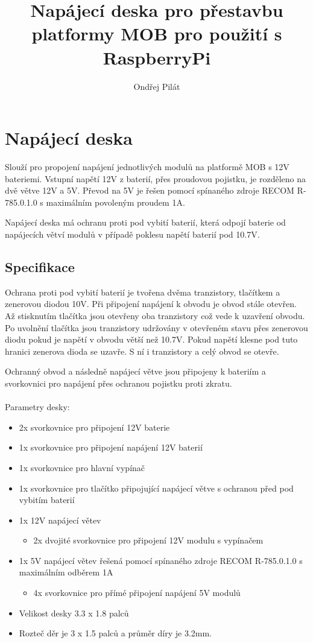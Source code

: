 \documentclass[a4paper,11pt]{article}
\author{Ondřej Pilát}
\title{Napájecí deska pro přestavbu platformy MOB pro použití s RaspberryPi}
\begin{document}
\maketitle
\newpage
\tableofcontents
\newpage
\section{Napájecí deska}
Slouží pro propojení napájení jednotlivých modulů na platformě MOB s 12V bateriemi. Vstupní napětí 12V z baterií, přes proudovou pojistku, je rozděleno na dvě větve 12V a 5V. Převod na 5V je řešen pomocí spínaného zdroje RECOM R-785.0.1.0 s maximálním povoleným proudem 1A. 

Napájecí deska má ochranu proti pod vybití baterií, která odpojí baterie od napájecích větví modulů v případě poklesu napětí baterií pod 10.7V. 

\subsection{Specifikace}

Ochrana proti pod vybití baterií je tvořena dvěma tranzistory, tlačítkem a zenerovou diodou 10V. Při připojení napájení k obvodu je obvod stále otevřen. Až stisknutím tlačítka jsou otevřeny oba tranzistory což vede k uzavření obvodu. Po uvolnění tlačítka jsou tranzistory udržovány v otevřeném stavu přes zenerovou diodu pokud je napětí v obvodu větší než 10.7V. Pokud napětí klesne pod tuto hranici zenerova dioda se uzavře. S ní i tranzistory a celý obvod se otevře.

Ochranný obvod a následně napájecí větve jsou připojeny k bateriím a svorkovnici pro napájení přes ochranou pojistku proti zkratu.
\\
\\
Parametry desky:
\begin{itemize}
	\item 2x svorkovnice pro připojení 12V baterie
	\item 1x svorkovnice pro připojení napájení 12V baterií
	\item 1x svorkovnice pro hlavní vypínač
	\item 1x svorkovnice pro tlačítko připojující napájecí větve s ochranou před pod vybitím baterií
	\item 1x 12V napájecí větev
		\begin{itemize}
			\item 2x dvojité svorkovnice pro připojení 12V modulu s vypínačem
		\end{itemize}
	\item 1x 5V napájecí větev řešená pomocí spínaného zdroje RECOM R-785.0.1.0 s maximálním odběrem 1A
		\begin{itemize}
			\item 4x svorkovnice pro přímé připojení napájení 5V modulů
		\end{itemize}
	\item Velikost desky 3.3 x 1.8 palců
	\item Rozteč děr je 3 x 1.5 palců a průměr díry je 3.2mm.
\end{itemize}
\end{document}
